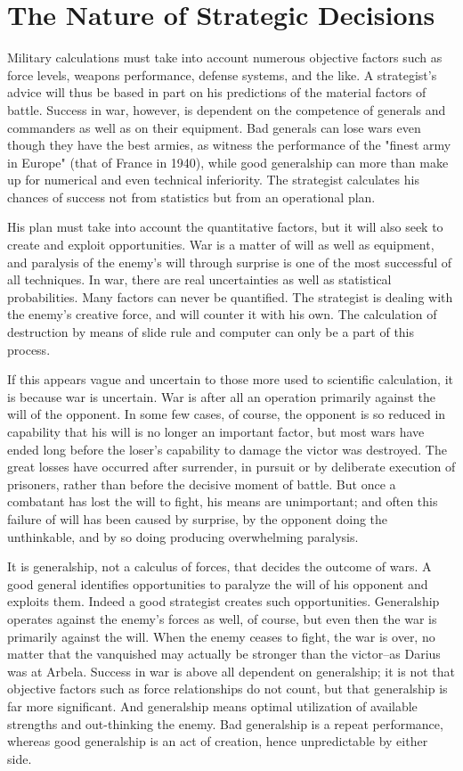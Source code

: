 \section{The Nature of Strategic Decisions}
Military calculations must take into account numerous objective factors such as force levels, weapons performance, defense systems, and the like. A strategist's advice will thus be based in part on his predictions of the material factors of battle. Success in war, however, is dependent on the competence of generals and commanders as well as on their equipment. Bad generals can lose wars even though they have the best armies, as witness the performance of the "finest army in Europe" (that of France in 1940), while good generalship can more than make up for numerical and even technical inferiority. The strategist calculates his chances of success not from statistics but from an operational plan.

His plan must take into account the quantitative factors, but it will also seek to create and exploit opportunities. War is a matter of will as well as equipment, and paralysis of the enemy's will through surprise is one of the most successful of all techniques. In war, there are real uncertainties as well as statistical probabilities. Many factors can never be quantified. The strategist is dealing with the enemy's creative force, and will counter it with his own. The calculation of destruction by means of slide rule and computer can only be a part of this process.

If this appears vague and uncertain to those more used to scientific calculation, it is because war is uncertain. War is after all an operation primarily against the will of the opponent. In some few cases, of course, the opponent is so reduced in capability that his will is no longer an important factor, but most wars have ended long before the loser's capability to damage the victor was destroyed. The great losses have occurred after surrender, in pursuit or by deliberate execution of prisoners, rather than before the decisive moment of battle. But once a combatant has lost the will to fight, his means are unimportant; and often this failure of will has been caused by surprise, by the opponent doing the unthinkable, and by so doing producing overwhelming paralysis.

It is generalship, not a calculus of forces, that decides the outcome of wars. A good general identifies opportunities to paralyze the will of his opponent and exploits them. Indeed a good strategist creates such opportunities. Generalship operates against the enemy's forces as well, of course, but even then the war is primarily against the will. When the enemy ceases to fight, the war is over, no matter that the vanquished may actually be stronger than the victor--as Darius was at Arbela. Success in war is above all dependent on generalship; it is not that objective factors such as force relationships do not count, but that generalship is far more significant. And generalship means optimal utilization of available strengths and out-thinking the enemy. Bad generalship is a repeat performance, whereas good generalship is an act of creation, hence unpredictable by either side.

